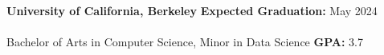 \documentclass[12pt]{article}
\begin{document}
    

        \begin{adjustwidth}{1em}{1em}

            \textbf{University of California, Berkeley} 
            \hfill 
            \textbf{Expected Graduation:} May 2024 \\\\
            Bachelor of Arts in Computer Science, Minor in Data Science \hfill  \textbf{GPA:} 3.7

            \vspace{2.5mm}

        \end{adjustwidth}

    
\end{document}
